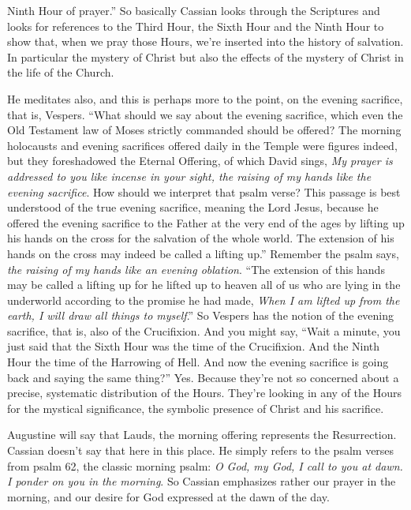 Ninth Hour of prayer.'' So basically Cassian looks through the Scriptures and looks for references to the Third Hour, the Sixth Hour and the Ninth Hour to show that, when we pray those Hours, we're inserted into the history of salvation. In particular the mystery of Christ but also the effects of the mystery of Christ in the life of the Church.

He meditates also, and this is perhaps more to the point, on the evening sacrifice, that is, Vespers. ``What should we say about the evening sacrifice, which even the Old Testament law of Moses strictly commanded should be offered? The morning holocausts and evening sacrifices offered daily in the Temple were figures indeed, but they foreshadowed the Eternal Offering, of which David sings, \emph{My prayer is addressed to you like incense in your sight, the raising of my hands like the evening sacrifice}. How should we interpret that psalm verse? This passage is best understood of the true evening sacrifice, meaning the Lord Jesus, because he offered the evening sacrifice to the Father at the very end of the ages by lifting up his hands on the cross for the salvation of the whole world. The extension of his hands on the cross may indeed be called a lifting up.'' Remember the psalm says, \emph{the raising of my hands like an evening oblation}. ``The extension of this hands may be called a lifting up for he lifted up to heaven all of us who are lying in the underworld according to the promise he had made, \emph{When I am lifted up from the earth, I will draw all things to myself}.'' So Vespers has the notion of the evening sacrifice, that is, also of the Crucifixion. And you might say, ``Wait a minute, you just said that the Sixth Hour was the time of the Crucifixion. And the Ninth Hour the time of the Harrowing of Hell. And now the evening sacrifice is going back and saying the same thing?'' Yes. Because they're not so concerned about a precise, systematic distribution of the Hours. They're looking in any of the Hours for the mystical significance, the symbolic presence of Christ and his sacrifice.

Augustine will say that Lauds, the morning offering represents the Resurrection. Cassian doesn't say that here in this place. He simply refers to the psalm verses from psalm 62, the classic morning psalm: \emph{O God, my God, I call to you at dawn. I ponder on you in the morning}. So Cassian emphasizes rather our prayer in the morning, and our desire for God expressed at the dawn of the day.

